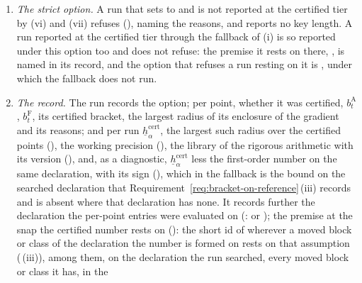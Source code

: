 \begin{requirement}
\begin{enumerate}[label=(\roman*),leftmargin=2.4em]
  on carries a weight routed from a receiver's high-photon weights
  () into which a per-setting weight
  enters that the receiver's artifact records as evaluated in floating point
  (), the uniform weight of a slot entry
  counting the weight of every setting as entering it, reason
  . Its certified number is then
  recorded with the reason, and the run's number, key length and tier are
  those it has without this requirement.
\item \emph{The strict option.} A run that sets
   to  and is not reported at the
  certified tier by (vi) and (vii) refuses
  (), naming the reasons, and reports no key
  length. A run reported at the certified tier through the fallback of (i)
  is so reported under this option too and does not refuse: the premise it
  rests on there, , is named in its
  record, and the option that refuses a run resting on it is
  , under which the fallback does not run.
\item \emph{The record.} The run records the option; per point, whether it
  was certified, $b^{\mathrm A}_t$, $b^{\mathrm F}_t$, its certified bracket,
  the largest radius of its enclosure of the gradient and its reasons; and
  per run $\underline{h}^{\mathrm{cert}}_{\alpha}$, the largest such radius
  over the certified points (), the working
  precision (), the library of the
  rigorous arithmetic with its version (), and,
  as a diagnostic, $\underline{h}^{\mathrm{cert}}_{\alpha}$ less the
  first-order number on the same declaration, with its sign
  (), which in the fallback is the bound
  on the searched declaration that
  Requirement~\ref{req:bracket-on-reference}\,(iii) records and is absent
  where that declaration has none. It records further the declaration the
  per-point entries were evaluated on (:
   or ); the premise at the
  snap the certified number rests on (): the short id of
   wherever a moved block or class
  of the declaration the number is formed on rests on that assumption
  (\,(iii)), among them, on the
  declaration the run searched, every moved block or class it has, in the

\end{enumerate}
\end{requirement}
